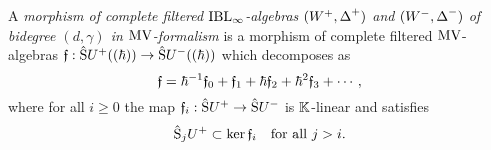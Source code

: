 \documentclass[\MainFolder/Text.tex]{subfiles}
\begin{document}
\begin{Definition}
A \emph{morphism of complete filtered $\mathrm{IBL}_\infty$-algebras $(W^+,\operatorname{\Delta}^+)$ and $(W^-,\operatorname{\Delta}^-)$ of bidegree $(d,\gamma)$ in $\mathrm{MV}$-formalism} is a morphism of complete filtered $\mathrm{MV}$-algebras $\mathfrak{f}: \hat{\mathrm{S}}U^+((\hbar)) \rightarrow \hat{\mathrm{S}}U^-((\hbar))$ which decomposes as 
\begin{equation}\label{Eq:MorDecompRel}
 \mathfrak{f} = \hbar^{-1}\mathfrak{f}_0 + \mathfrak{f}_1 + \hbar\mathfrak{f}_2 + \hbar^2\mathfrak{f}_3 + \dotsb,
\end{equation}
where for all $i\ge 0$ the map $\mathfrak{f}_i : \hat{\mathrm{S}}U^+\rightarrow\hat{\mathrm{S}}U^-$ is $\mathbb{K}$-linear and satisfies 
\begin{equation}\label{Eq:CondOnMor}
\hat{\mathrm{S}}_{j}U^+\subset\ker \mathfrak{f}_i\quad\text{for all }j>i.
\end{equation}
\end{Definition}
\end{document}
